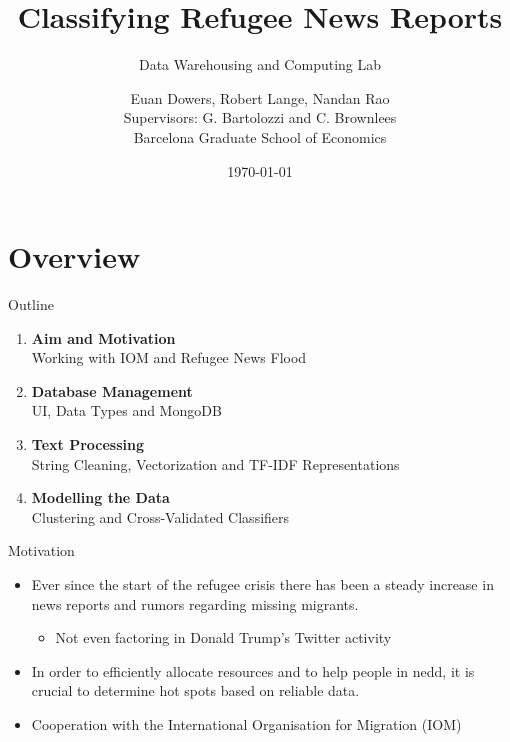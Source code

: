 \documentclass{beamer}
\begin{document}
\title{Classifying Refugee News Reports}
\subtitle{Data Warehousing and Computing Lab}

\author{Euan Dowers, Robert Lange, Nandan Rao \\ Supervisors: G. Bartolozzi and C. Brownlees \\ Barcelona Graduate School of Economics}
\date{\today}



\begin{frame}
\titlepage
\end{frame}

\section*{Overview}

\begin{frame}{Outline}
\nocite{*}
\begin{enumerate}
	\item \textbf{Aim and Motivation}\\
		\small{Working with IOM and Refugee News Flood}
	\item \textbf{Database Management}\\
	    \small{UI, Data Types and MongoDB}\\
	\item \textbf{Text Processing}\\
	    \small{String Cleaning, Vectorization and TF-IDF Representations}
	\item \textbf{Modelling the Data} \\
	    \small{Clustering and Cross-Validated Classifiers}  
\end{enumerate}	

\end{frame}


\begin{frame}{Motivation}

\begin{itemize}

\item Ever since the start of the refugee crisis there has been a steady increase in news reports and rumors regarding missing migrants.

	\begin{itemize}
		\item Not even factoring in Donald Trump's Twitter activity
	\end{itemize}

\item In order to efficiently allocate resources and to help people in nedd, it is crucial to determine hot spots based on reliable data.
\item Cooperation with the International Organisation for Migration (IOM)


\end{itemize}


\end{frame}
\end{document}
